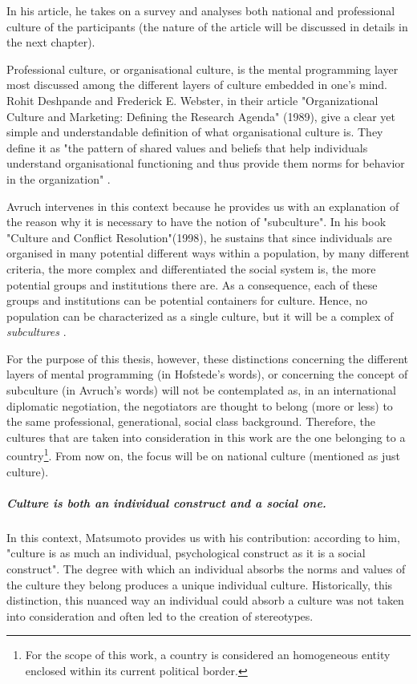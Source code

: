 \documentclass[../main.tex]{subfiles}
\begin{document}
In his article, he takes on a survey and analyses both national and professional culture of the participants (the nature of the article will be discussed in details in the next chapter).

Professional culture, or organisational culture, is the mental programming layer most discussed among the different layers of culture embedded in one's mind. Rohit Deshpande and Frederick E. Webster, in their article "Organizational Culture and Marketing: Defining the Research Agenda" (1989), give a clear yet simple and understandable definition of what organisational culture is. They define it as "the pattern of shared values and beliefs that help individuals understand organisational functioning and thus provide them norms for behavior in the organization" \autocite[4]{rohit}.

Avruch intervenes in this context because he provides us with an explanation of the reason why it is necessary to have the notion of "subculture". In his book "Culture and Conflict Resolution"(1998), he sustains that since individuals are organised in many potential different ways within a population, by many different criteria, the more complex and differentiated the social system is, the more potential groups and institutions there are. As a consequence, each of these groups and institutions can be potential containers for culture. Hence, no population can be characterized as a single culture, but it will be a complex of \textit{subcultures} \autocite[18]{avruch}. %

For the purpose of this thesis, however, these distinctions concerning the different layers of mental programming (in Hofstede's words), or concerning the concept of subculture (in Avruch's words) will not be contemplated as, in an international diplomatic negotiation, the negotiators are thought to belong (more or less) to the same professional, generational, social class background. Therefore, the cultures that are taken into consideration in this work are the one belonging to a country\footnote{For the scope of this work, a country is considered an homogeneous entity enclosed within its current political border.}. From now on, the focus will be on national culture (mentioned as just culture).

\subparagraph*{Culture is both an individual construct and a social one.} In this context, Matsumoto provides us with his contribution: according to him, "culture is as much an individual, psychological construct as it is a social construct"\autocite[18]{matsumoto}. The degree with which an individual absorbs the norms and values of the culture they belong produces a unique individual culture. Historically, this distinction, this nuanced way an individual could absorb a culture was not taken into consideration and often led to the creation of stereotypes.
\end{document}
